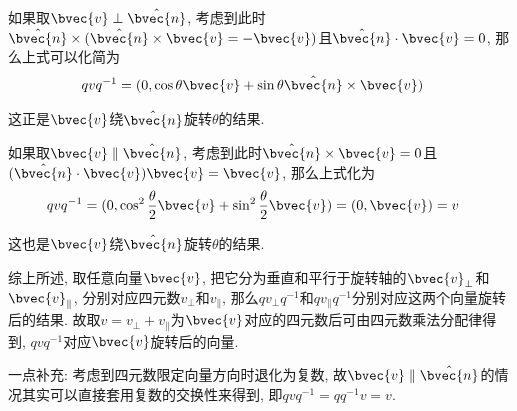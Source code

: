如果取$\bvec{v}\perp\hat{\bvec{n}}$, 考虑到此时$\hat{\bvec{n}}\times(\hat{\bvec{n}}\times\bvec{v}=-\bvec{v})$且$\hat{\bvec{n}}\cdot\bvec{v}=0$, 那么上式可以化简为
\begin{equation}
\begin{aligned}
qvq^{-1}&=(0, \cos\theta\bvec{v}+\sin\theta\hat{\bvec{n}}\times\bvec{v})
\end{aligned}
\end{equation}

这正是$\bvec{v}$绕$\hat{\bvec{n}}$旋转$\theta$的结果. 

如果取$\bvec{v}\parallel\hat{\bvec{n}}$, 考虑到此时$\hat{\bvec{n}}\times\bvec{v}=0$且$(\hat{\bvec{n}}\cdot\bvec{v})\bvec{v}=\bvec{v}$, 那么上式化为
\begin{equation}
\begin{aligned}
qvq^{-1}&=(0, \cos^2\frac{\theta}{2}\bvec{v}+\sin^2\frac{\theta}{2}\bvec{v})=(0, \bvec{v})=v
\end{aligned}
\end{equation}

这也是$\bvec{v}$绕$\hat{\bvec{n}}$旋转$\theta$的结果. 

综上所述, 取任意向量$\bvec{v}$, 把它分为垂直和平行于旋转轴的$\bvec{v}_\perp$和$\bvec{v}_\parallel$, 分别对应四元数$v_\perp$和$v_\parallel$, 那么$q v_\perp q^{-1}$和$q v_\parallel q^{-1}$分别对应这两个向量旋转后的结果. 故取$v=v_\perp+v_\parallel$为$\bvec{v}$对应的四元数后可由四元数乘法分配律得到, $qvq^{-1}$对应$\bvec{v}$旋转后的向量. 

一点补充: 考虑到四元数限定向量方向时退化为复数, 故$\bvec{v}\parallel\hat{\bvec{n}}$的情况其实可以直接套用复数的交换性来得到, 即$qvq^{-1}=qq^{-1}v=v$. 

